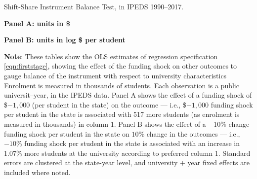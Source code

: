 \newpage
\begin{table}[H]
    \singlespacing
    \centering
    \caption{Shift-Share Instrument Balance Test, in IPEDS 1990--2017.}

    \textbf{Panel A: units in \$}

    \makebox[\textwidth][c]{}
    
    \textbf{Panel B: units in log \$ per student}
    
    \makebox[\textwidth][c]{}

    \justify
    \footnotesize
    \textbf{Note}:
    These tables show the OLS estimates of regression specification \eqref{eqn:firststage}, showing the effect of the funding shock on other outcomes to gauge balance of the instrument with respect to university characteristics
    Enrolment is measured in thousands of students.
    Each observation is a public universit--year, in the IPEDS data.
    Panel A shows the effect of a funding shock of \$$-1,000$ (per student in the state) on the outcome --- i.e.,
    \$$-1,000$ funding shock per student in the state is associated with 517 more students (as enrolment is measured in thousands) in column 1.
    Panel B shows the effect of a $-10$\% change funding shock per student in the state on $10$\% change in the outcomes --- i.e.,
    $-10$\% funding shock per student in the state is associated with an increase in 1.07\% more students at the university according to preferred column 1.
    Standard errors are clustered at the state-year level, and university $+$ year fixed effects are included where noted.
    \label{tab:firststage-balance}
\end{table}

